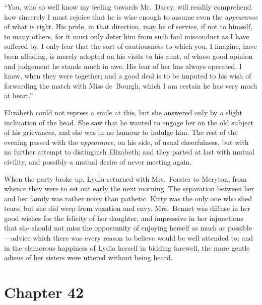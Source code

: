 ``You, who so well know my feeling towards Mr.\ Darcy, will
readily comprehend how sincerely I must rejoice that he is
wise enough to assume even the \emph{appearance} of what is right.
His pride, in that direction, may be of service, if not to himself,
to many others, for it must only deter him from such foul
misconduct as I have suffered by.  I only fear that the sort of
cautiousness to which you, I imagine, have been alluding, is
merely adopted on his visits to his aunt, of whose good opinion
and judgement he stands much in awe.  His fear of her has
always operated, I know, when they were together; and a good
deal is to be imputed to his wish of forwarding the match with
Miss de~Bourgh, which I am certain he has very much at heart.''

Elizabeth could not repress a smile at this, but she answered only
by a slight inclination of the head.  She saw that he wanted to
engage her on the old subject of his grievances, and she was in
no humour to indulge him.  The rest of the evening passed with
the \emph{appearance}, on his side, of usual cheerfulness, but with
no further attempt to distinguish Elizabeth; and they parted at
last with mutual civility, and possibly a mutual desire of never
meeting again.

When the party broke up, Lydia returned with Mrs.\ Forster to
Meryton, from whence they were to set out early the next
morning.  The separation between her and her family was rather
noisy than pathetic.  Kitty was the only one who shed tears; but
she did weep from vexation and envy.  Mrs.\ Bennet was diffuse
in her good wishes for the felicity of her daughter, and
impressive in her injunctions that she should not miss the
opportunity of enjoying herself as much as possible---advice
which there was every reason to believe would be well attended
to; and in the clamorous happiness of Lydia herself in bidding
farewell, the more gentle adieus of her sisters were uttered
without being heard.



\chapter{Chapter 42}


